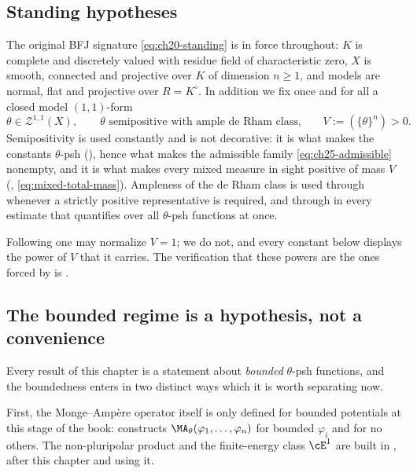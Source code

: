 \subsection{Standing hypotheses}
\label{sec:ch25-hypotheses}

The original BFJ signature \eqref{eq:ch20-standing} is in force throughout:
\(K\) is complete and discretely valued with residue field of characteristic
zero, \(X\) is smooth, connected and projective over \(K\) of dimension
\(n\geq1\), and models are normal, flat and projective over \(R=K^\circ\).
In addition we fix once and for all a closed model \((1,1)\)-form
\begin{equation}
\label{eq:ch25-reference-form}
 \theta\in\mathcal Z^{1,1}(X),
 \qquad\text{\(\theta\) semipositive with ample de Rham class,}
 \qquad V:=(\{\theta\}^n)>0 .
\end{equation}
Semipositivity is used constantly and is not decorative: it is what makes the
constants \(\theta\)-psh (), hence what makes the
admissible family \eqref{eq:ch25-admissible} nonempty, and it is what makes
every mixed measure in sight positive of mass \(V\)
(, \eqref{eq:mixed-total-mass}).  Ampleness of the
de Rham class is used through
 whenever a strictly positive
representative is required, and through
 in every estimate that quantifies over
all \(\theta\)-psh functions at once.

Following \cite[\S\S4--5]{BFJ15} one may normalize \(V=1\); we do not, and
every constant below displays the power of \(V\) that it carries.  The
verification that these powers are the ones forced by
 is .

\subsection{The bounded regime is a hypothesis, not a convenience}
\label{sec:ch25-bounded-regime}

Every result of this chapter is a statement about \emph{bounded}
\(\theta\)-psh functions, and the boundedness enters in two distinct ways
which it is worth separating now.

First, the Monge--Amp\`ere operator itself is only defined for bounded
potentials at this stage of the book: 
constructs \(\MA_\theta(\varphi_1,\ldots,\varphi_n)\) for bounded
\(\varphi_i\) and for no others.  The non-pluripolar product
 and the finite-energy class \(\cE^1\) are built
in , after this chapter and using it.


